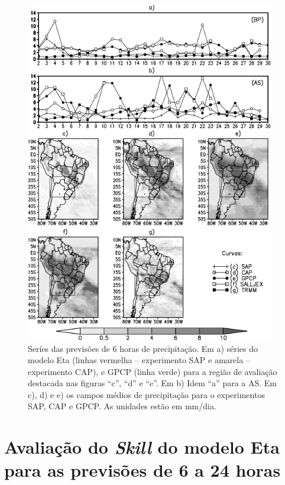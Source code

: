 \begin{figure}[!hbp]
\centering
\includegraphics[height=15cm]{./figs/serie_precipitacao-FCT06h.png}
\caption{Seríes das previsões de 6 horas de precipitação. Em a) séries do modelo Eta (linhas vermelha – experimento SAP e amarela – experimento CAP), e GPCP (linha verde) para a região de avaliação destacada nas figuras ``c'', ``d'' e ``e''. Em b) Idem ``a'' para a AS. Em c), d) e e) os campos médios de precipitação para o experimentos SAP, CAP e GPCP. As unidades estão em mm/dia.}
\label{fig52}
\end{figure}

\section{Avaliação do \textit{Skill} do modelo Eta para as previsões de 6 a 24 horas}
\label{ss:avalskill}

